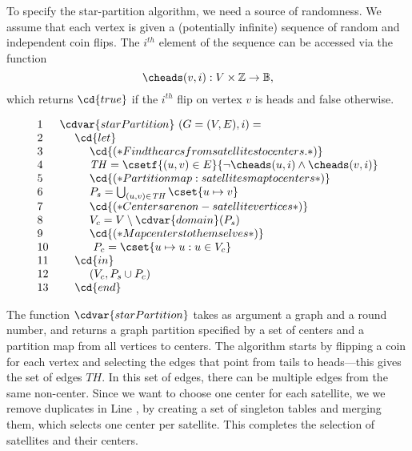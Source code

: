 \begin{group}
\begin{algorithm}
\label{alg:graphcon::starPartition}

To specify the star-partition algorithm, we need
a source of randomness.
%
We assume that each vertex is given a (potentially infinite) sequence
of random and independent coin flips. The $i^{th}$ element of the
sequence can be accessed via the function
\[
\cheads(v,i) : V \times \mathbb{Z} \to \mathbb{B}, 
\]
which returns $\cd{true}$ if the $i^{th}$ flip on vertex $v$ is heads
and false otherwise. 

\[
\begin{array}{ll}
1 & \cdvar{starPartition}~(G=(V,E),i) =
\\
2 & ~~~~\cd{let}
\\
3 & ~~~~~~~~\cd{(* Find the arcs from satellites to centers. *)}
\\
4 & ~~~~~~~~\mathit{TH} = \csetf{(u,v) \in E}{\neg \cheads(u,i) \land \cheads(v,i)} %
\\
5 & ~~~~~~~~\cd{(* Partition map: satellites map to centers *)}
\\
6 & ~~~~~~~~P_s = \bigcup_{(u,v) \in \mathit{TH}} \cset{u \mapsto v}
\\
7 & ~~~~~~~~\cd{(* Centers are non-satellite vertices *)}
\\
8 & ~~~~~~~~V_c = V \setminus \cdvar{domain}(P_s)
\\
9 & ~~~~~~~~\cd{(* Map centers to themselves *)}
\\
10 & ~~~~~~~~~P_c = \cset{u \mapsto u : u \in V_c} %
\\
11 & ~~~~\cd{in}
\\
12 & ~~~~~~~~(V_c, P_s \cup P_c)
\\
13 & ~~~~\cd{end}
\end{array}
\]

The function $\cdvar{starPartition}$ takes as argument a graph and a round
number, and returns a graph partition specified by a set of centers and
a partition map from all vertices to centers.
%
The algorithm starts by flipping a coin for each vertex and selecting
the edges that point from tails to heads---this gives the set of edges
$\mathit{TH}$.
%
In this set of edges, there can be multiple edges from the same
non-center. Since we want to choose one center for each satellite, we
we remove duplicates in Line \linegcstarmerge{}, by creating a set of
singleton tables and merging them, which selects one center per
satellite.
%
This completes the selection of satellites and their centers. 
%


\end{algorithm}
\end{group}
